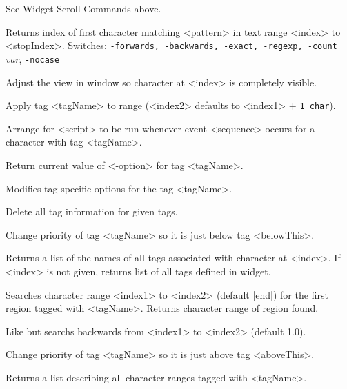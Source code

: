 \begin{enum}{1cm}
See Widget Scroll Commands above.

Returns index of first character matching <pattern> in text range
<index> to <stopIndex>. Switches: {\small {\tt -forwards, -backwards,
-exact, -regexp, -count} {\it var}, {\tt -nocase}}

Adjust the view in window so character at <index> is completely visible.

Apply tag <tagName> to range (<index2> defaults to <index1> $+$ {\tt 1 char}).

Arrange for <script> to be run whenever event <sequence> occurs
for a character with tag <tagName>.

Return current value of <-option> for tag <tagName>.

Modifies tag-specific options for the tag <tagName>.

Delete all tag information for given tags.

Change priority of tag <tagName> so it is just below tag <belowThis>.

Returns a list of the names of all tags associated with character at <index>.
If <index> is not given, returns list of all tags defined in widget.

Searches character range <index1> to <index2> (default |end|) for the first
region tagged with <tagName>. Returns character range of region found.

Like  but searchs backwards from <index1> to 
<index2> (default 1.0).

Change priority of tag <tagName> so it is just above tag <aboveThis>.

Returns a list describing all character ranges tagged with <tagName>.


\end{enum}
